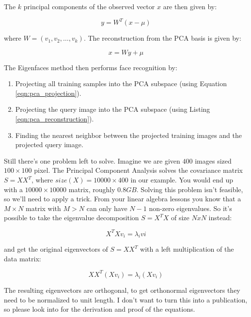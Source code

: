 The $k$ principal components of the observed vector $x$ are then given by:

\begin{equation} \label{eqn:pca_projection}
	y = W^{T} (x - \mu)
\end{equation}

where $W = (v_{1}, v_{2}, \ldots, v_{k})$. The reconstruction from the PCA basis is given by:

\begin{equation} \label{eqn:pca_reconstruction}
	x = W y + \mu
\end{equation}

The Eigenfaces method then performs face recognition by:

\begin{enumerate}
	\item Projecting all training samples into the PCA subspace (using Equation \ref{eqn:pca_projection}).
	\item Projecting the query image into the PCA subspace (using Listing \ref{eqn:pca_reconstruction}).
	\item Finding the nearest neighbor between the projected training images and the projected query image.
\end{enumerate}

Still there's one problem left to solve. Imagine we are given $400$ images sized $100 \times 100$ pixel. The Principal Component Analysis solves the covariance matrix $S = X X^{T}$, where ${size}(X) = 10000 \times 400$ in our example. You would end up with a $10000 \times 10000$ matrix, roughly $0.8 GB$. Solving this problem isn't feasible, so we'll need to apply a trick. From your linear algebra lessons you know that a $M \times N$ matrix with $M > N$ can only have $N - 1$ non-zero eigenvalues. So it's possible to take the eigenvalue decomposition $S = X^{T} X$ of size $N x N$ instead:

\begin{equation}
	X^{T} X v_{i} = \lambda_{i} v{i}
\end{equation}

and get the original eigenvectors of $S = X X^{T}$ with a left multiplication of the data matrix:

\begin{equation}
	X X^{T} (X v_{i}) = \lambda_{i} (X v_{i})
\end{equation}

The resulting eigenvectors are orthogonal, to get orthonormal eigenvectors they need to be normalized to unit length. I don't want to turn this into a publication, so please look into \cite{Duda2001} for the derivation and proof of the equations.

